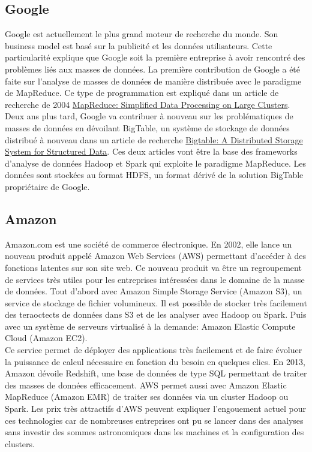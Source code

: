   \subsection{Google}

    Google est actuellement le plus grand moteur de recherche du monde. Son business model est basé sur la publicité et les données utilisateurs. Cette particularité explique que Google soit la première entreprise à avoir rencontré des problèmes liés aux masses de données. La première contribution de Google a été faite sur l'analyse de masses de données de manière distribuée avec le paradigme de MapReduce. Ce type de programmation est expliqué dans un article de recherche de 2004 \href{https://www.usenix.org/legacy/publications/library/proceedings/osdi04/tech/full_papers/dean/dean_html/index.html}{MapReduce: Simplified Data Processing on Large Clusters}.\\

    Deux ans plus tard, Google va contribuer à nouveau sur les problématiques de masses de données en dévoilant BigTable, un système de stockage de données distribué à nouveau dans un article de recherche \href{http://static.googleusercontent.com/external_content/untrusted_dlcp/research.google.com/en/us/archive/bigtable-osdi06.pdf}{Bigtable: A Distributed Storage System for Structured Data}. Ces deux articles vont être la base des frameworks d'analyse de données Hadoop et Spark qui exploite le paradigme MapReduce. Les données sont stockées au format HDFS, un format dérivé de la solution BigTable propriétaire de Google.

  \subsection{Amazon}
    Amazon.com est une société de commerce électronique. En 2002, elle lance un nouveau produit appelé Amazon Web Services (AWS) permettant d’accéder à des fonctions latentes sur son site web. Ce nouveau produit va être un regroupement de services très utiles pour les entreprises intéressées dans le domaine de la masse de données. Tout d'abord avec Amazon Simple Storage Service (Amazon S3), un service de stockage de fichier volumineux. Il est possible de stocker très facilement des teraoctects de données dans S3 et de les analyser avec Hadoop ou Spark. Puis avec un système de serveurs virtualisé à la demande: Amazon Elastic Compute Cloud (Amazon EC2). \\

    Ce service permet de déployer des applications très facilement et de faire évoluer la puissance de calcul nécessaire en fonction du besoin en quelques clics. En 2013, Amazon dévoile Redshift, une base de données de type SQL permettant de traiter des masses de données efficacement. AWS permet aussi avec Amazon Elastic MapReduce (Amazon EMR) de traiter ses données via un cluster Hadoop ou Spark. Les prix très attractifs d'AWS peuvent expliquer l'engouement actuel pour ces technologies car de nombreuses entreprises ont pu se lancer dans des analyses sans investir des sommes astronomiques dans les machines et la configuration des clusters.

